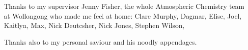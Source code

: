 \begin{acknowledgements}
  \addchaptertocentry{\acknowledgementname} %

  Thanks to my supervisor Jenny Fisher, the whole Atmospheric Chemistry team at Wollongong who made me feel at home: Clare Murphy, Dagmar, Elise, Joel, Kaitlyn, Max, Nick Deutcsher, Nick Jones, Stephen Wilson, 

  Thanks also to my personal saviour and his noodly appendages.

\end{acknowledgements}
